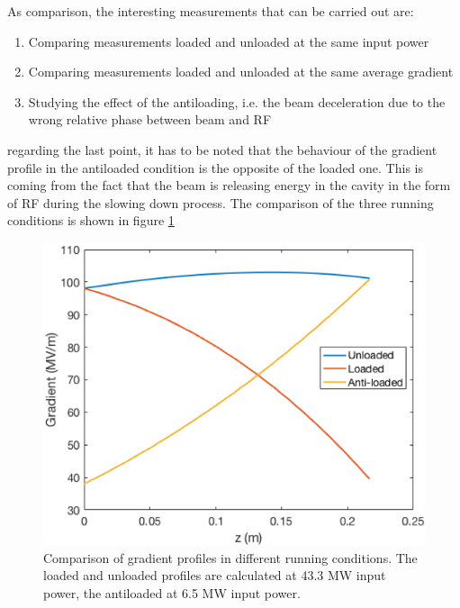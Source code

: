 As comparison, the interesting measurements that can be carried out are:
\begin{enumerate}
\item Comparing measurements loaded and unloaded at the same input power
\item Comparing measurements loaded and unloaded at the same average gradient
\item Studying the effect of the antiloading, i.e. the beam deceleration due to the wrong relative phase between beam and RF
\end{enumerate}
regarding the last point, it has to be noted that the behaviour of the gradient profile in the antiloaded condition is the opposite of the loaded one. This is coming from the fact that the beam is releasing energy in the cavity in the form of RF during the slowing down process. The comparison of the three running conditions is shown in figure \ref{3grad}

\begin{figure}[h]
\centering 
\includegraphics[scale=1]{pictures/3gradient.png}
\caption{Comparison of gradient profiles in different running conditions. The loaded and unloaded profiles are calculated at 43.3 MW input power, the antiloaded at 6.5 MW input power. }
\label{3grad}
\end{figure}